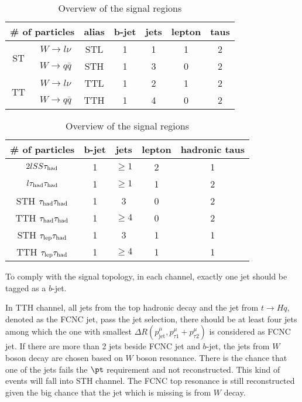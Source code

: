 \begin{table}
\footnotesize
\centering
\caption{Overview of the final states of signal events}
\begin{tabular}[h]{c|c|c|c|c|c|c}
\hline \hline

\multicolumn{2}{c|}{\# of particles}	& alias & b-jet & jets & lepton & taus\\ \hline
\multirow{2}{*}{ST}	& $W\to l\nu$		& STL   & 1	    & 1    & 1      & 2   \\ \cline{2-7}
					& $W\to q\bar{q}$	& STH   & 1	    & 3    & 0      & 2   \\ \hline
\multirow{2}{*}{TT}	& $W\to l\nu$		& TTL   & 1	    & 2    & 1      & 2   \\ \cline{2-7}
					& $W\to q\bar{q}$	& TTH   & 1	    & 4    & 0      & 2   \\ \hline
\end{tabular}
\footnotesize
\centering
\caption{Overview of the signal regions}
\begin{tabular}[h]{c|c|c|c|c}
\hline \hline
\# of particles& b-jet & jets   & lepton & hadronic taus\\ \hline
$2lSS\tau_\text{had}$  & 1     & $\ge1$ & 2      & 1			\\ \hline
$l\tau_\text{had}{}\tau_\text{had}$	   & 1     & $\ge1$ & 1      & 2            \\ \hline
STH $\tau_\text{had}{}\tau_\text{had}$ & 1     & 3      & 0      & 2            \\ \hline
TTH $\tau_\text{had}{}\tau_\text{had}$ & 1     & $\ge4$ & 0      & 2            \\ \hline
STH $\tau_\text{lep}{}\tau_\text{had}$   & 1     & 3      & 1      & 1            \\ \hline
TTH $\tau_\text{lep}{}\tau_\text{had}$   & 1     & $\ge4$ & 1      & 1            \\ \hline
\end{tabular}
\label{tab:signalevents}
\end{table}

To comply with the signal topology, in each channel, exactly one jet should be tagged as a $b$-jet. 

In TTH channel, all jets from the top hadronic decay and the jet from $t\to Hq$, denoted as the FCNC jet, pass the jet selection, there should be at least four jets 
among which the one with smallest $\Delta R(p^{\mu}_{\text{jet}},p^{\mu}_{\tau1}+p^{\mu}_{\tau2})$ is considered as FCNC jet. If there are more than 2 jets beside FCNC jet and $b$-jet, the jets from $W$ boson decay are chosen based on $W$ boson resonance. There is the chance that one of the jets fails the $\pt$ requirement and not reconstructed. This kind of events will fall into STH channel. The FCNC top resonance is still reconstructed given the big chance that the jet which is missing is from $W$ decay.

